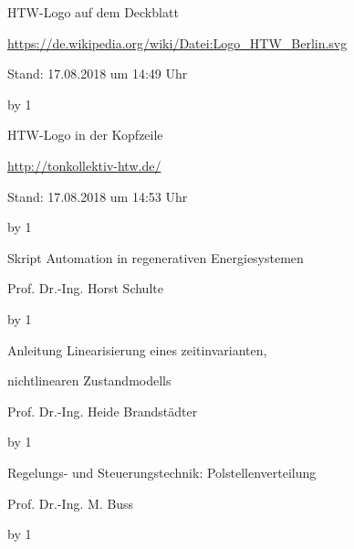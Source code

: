 \documentclass[
	pagesize,
	fontsize=12pt,
	paper=a4,
	oneside,
    reqno
]{scrartcl}
\numberwithin{equation}{section} %
\numberwithin{table}{section} %
\numberwithin{figure}{section} %
\begin{document}
\begin{thebibliography}{999}
{\setlength{\emergencystretch}{3cm}%

HTW-Logo auf dem Deckblatt\par
\url{https://de.wikipedia.org/wiki/Datei:Logo_HTW_Berlin.svg} \par
 Stand: 17.08.2018 um 14:49 Uhr

\advance\Quellennummer by 1
 
HTW-Logo in der Kopfzeile\par
\url{http://tonkollektiv-htw.de/} \par
 Stand: 17.08.2018 um 14:53 Uhr

\advance\Quellennummer by 1

Skript Automation in regenerativen Energiesystemen\par
Prof.\xspace Dr.\xspace -Ing.\xspace Horst Schulte

\advance\Quellennummer by 1

Anleitung Linearisierung eines zeitinvarianten,\par
nichtlinearen Zustandmodells\par
Prof.\xspace Dr.\xspace -Ing.\xspace Heide Brandstädter

\advance\Quellennummer by 1

Regelungs- und Steuerungstechnik: Polstellenverteilung\par
Prof.\xspace Dr.\xspace -Ing.\xspace M. Buss

\advance\Quellennummer by 1

}
\end{thebibliography}
\end{document}
